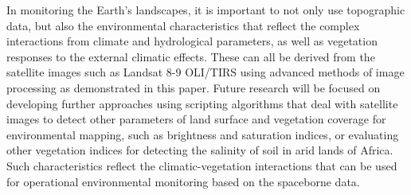 \documentclass[jimaging,article,submit,pdftex,moreauthors]{Definitions/mdpi}
\begin{document}
In monitoring the Earth's landscapes, it is important to not only use topographic data, but also the environmental characteristics that reflect the complex interactions from climate and hydrological parameters, as well as vegetation responses to the external climatic effects. These can all be derived from the satellite images such as Landsat 8-9 OLI/TIRS using advanced methods of image processing as demonstrated in this paper. Future research will be focused on developing further approaches using scripting algorithms that deal with satellite images to detect other parameters of land surface and vegetation coverage for environmental mapping, such as brightness and saturation indices, or evaluating other vegetation indices for detecting the salinity of soil in arid lands of Africa. Such characteristics reflect the climatic-vegetation interactions that can be used for operational environmental monitoring based on the spaceborne data.  







\end{document}
